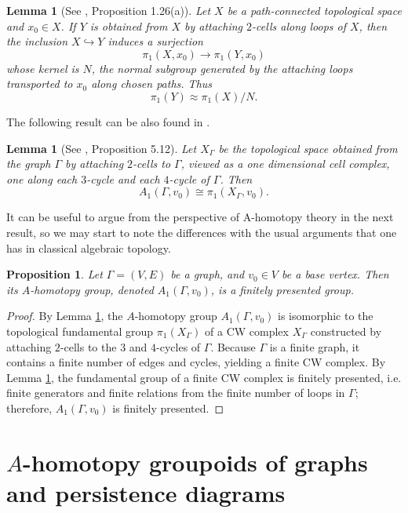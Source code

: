 \documentclass{amsart}
\newtheorem{lemma}[theorem]{Lemma}
\newtheorem{proposition}[theorem]{Proposition}
\begin{document}
\begin{lemma}[See \cite{hatcher}, Proposition 1.26(a)] \label{2cellspace}
Let $X$ be a path-connected topological space and $x_0 \in X$. If $Y$ is obtained from $X$ by attaching $2$-cells along loops of $X$, then the inclusion $X \hookrightarrow Y$ induces a surjection $$\pi_1(X, x_0) \to \pi_1(Y, x_0)$$ whose kernel is $N$, the normal subgroup generated by the attaching loops transported to $x_0$ along chosen paths. Thus $$\pi_1(Y) \approx \pi_1(X)/N.$$
\end{lemma}

The following result can be also found in  \cite[p.~32]{Babson2006}.

\begin{lemma}[See \cite{foundations}, Proposition 5.12] \label{2cellgraph}
Let $X_\Gamma$ be the topological space obtained from the graph $\Gamma$ by attaching $2$-cells to $\Gamma$, viewed as a one dimensional cell complex, one along each $3$-cycle and each $4$-cycle of $\Gamma$. Then $$A_1(\Gamma,v_0) \cong \pi_1(X_\Gamma,v_0).$$
\end{lemma}

It can be useful to argue from the perspective of A-homotopy theory in the next result, so we may start to note the differences with the usual arguments that one has in classical algebraic topology.

\begin{proposition} \label{finpres}
Let $\Gamma = (V, E)$ be a graph, and $v_0 \in V$ be a base vertex. Then its $A$-homotopy group, denoted $A_1(\Gamma, v_0)$, is a finitely presented group.
\end{proposition}

\begin{proof}
By Lemma \ref{2cellgraph}, the $A$-homotopy group $A_1(\Gamma, v_0)$ is isomorphic to the topological fundamental group $\pi_1(X_\Gamma)$ of a CW complex $X_\Gamma$ constructed by attaching $2$-cells to the $3$ and $4$-cycles of $\Gamma$. Because $\Gamma$ is a finite graph, it contains a finite number of edges and cycles, yielding a finite CW complex. By Lemma \ref{2cellspace}, the fundamental group of a finite CW complex is finitely presented, i.e. finite generators and finite relations from the finite number of loops in $\Gamma$; therefore, $A_1(\Gamma, v_0)$ is finitely presented.
\end{proof}



\section{\texorpdfstring{$A$}{A}-homotopy groupoids of graphs and persistence diagrams}\label{s3}
\end{document}
